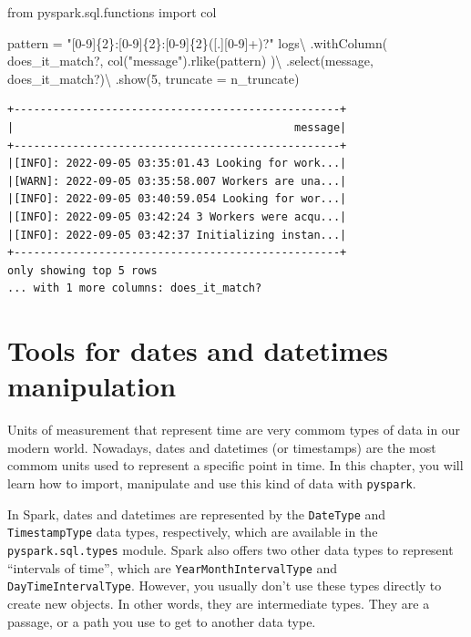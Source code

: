 \documentclass[
  11pt,
  letterpaper,
  DIV=11,
  numbers=noendperiod]{scrreprt}
\newenvironment{Shaded}{\begin{snugshade}}{\end{snugshade}}
\newcommand{\DecValTok}[1]{\textcolor[rgb]{0.68,0.00,0.00}{#1}}
\newcommand{\ImportTok}[1]{\textcolor[rgb]{0.00,0.46,0.62}{#1}}
\newcommand{\NormalTok}[1]{\textcolor[rgb]{0.00,0.23,0.31}{#1}}
\newcommand{\OperatorTok}[1]{\textcolor[rgb]{0.37,0.37,0.37}{#1}}
\newcommand{\SpecialCharTok}[1]{\textcolor[rgb]{0.37,0.37,0.37}{#1}}
\newcommand{\StringTok}[1]{\textcolor[rgb]{0.13,0.47,0.30}{#1}}
\begin{document}
\begin{Shaded}
\begin{Highlighting}[]
\ImportTok{from}\NormalTok{ pyspark.sql.functions }\ImportTok{import}\NormalTok{ col}

\NormalTok{pattern }\OperatorTok{=} \StringTok{"[0{-}9]}\SpecialCharTok{\{2\}}\StringTok{:[0{-}9]}\SpecialCharTok{\{2\}}\StringTok{:[0{-}9]}\SpecialCharTok{\{2\}}\StringTok{([.][0{-}9]+)?"}
\NormalTok{logs}\OperatorTok{\textbackslash{}}
\NormalTok{    .withColumn(}
        \StringTok{\textquotesingle{}does\_it\_match?\textquotesingle{}}\NormalTok{,}
\NormalTok{        col(}\StringTok{"message"}\NormalTok{).rlike(pattern)}
\NormalTok{    )}\OperatorTok{\textbackslash{}}
\NormalTok{    .select(}\StringTok{\textquotesingle{}message\textquotesingle{}}\NormalTok{, }\StringTok{\textquotesingle{}does\_it\_match?\textquotesingle{}}\NormalTok{)}\OperatorTok{\textbackslash{}}
\NormalTok{    .show(}\DecValTok{5}\NormalTok{, truncate }\OperatorTok{=}\NormalTok{ n\_truncate)}
\end{Highlighting}
\end{Shaded}

\begin{verbatim}
+--------------------------------------------------+
|                                           message|
+--------------------------------------------------+
|[INFO]: 2022-09-05 03:35:01.43 Looking for work...|
|[WARN]: 2022-09-05 03:35:58.007 Workers are una...|
|[INFO]: 2022-09-05 03:40:59.054 Looking for wor...|
|[INFO]: 2022-09-05 03:42:24 3 Workers were acqu...|
|[INFO]: 2022-09-05 03:42:37 Initializing instan...|
+--------------------------------------------------+
only showing top 5 rows
... with 1 more columns: does_it_match?
\end{verbatim}


\chapter{Tools for dates and datetimes
manipulation}\label{sec-datetime-tools}

Units of measurement that represent time are very commom types of data
in our modern world. Nowadays, dates and datetimes (or timestamps) are
the most commom units used to represent a specific point in time. In
this chapter, you will learn how to import, manipulate and use this kind
of data with \texttt{pyspark}.

In Spark, dates and datetimes are represented by the \texttt{DateType}
and \texttt{TimestampType} data types, respectively, which are available
in the \texttt{pyspark.sql.types} module. Spark also offers two other
data types to represent ``intervals of time'', which are
\texttt{YearMonthIntervalType} and \texttt{DayTimeIntervalType}.
However, you usually don't use these types directly to create new
objects. In other words, they are intermediate types. They are a
passage, or a path you use to get to another data type.
\end{document}
